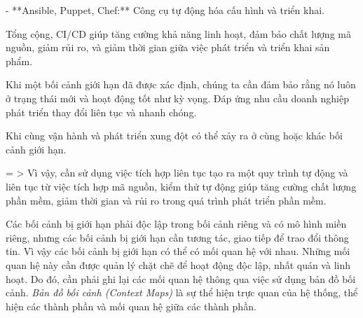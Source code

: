 - **Ansible, Puppet, Chef:** Công cụ tự động hóa cấu hình và triển khai.

Tổng cộng, CI/CD giúp tăng cường khả năng linh hoạt, đảm bảo chất lượng mã nguồn, giảm rủi ro, và giảm thời gian giữa việc phát triển và triển khai sản phẩm.











Khi một bối cảnh giới hạn đã được xác định, chúng ta cần đảm bảo rằng nó luôn ở trạng thái mới và hoạt động tốt như kỳ vọng. Đáp ứng nhu cầu doanh nghiệp phát triển thay đổi liên tục và nhanh chóng.

Khi cùng vận hành và phát triển xung đột có thể xảy ra ở cùng hoặc khác bối cảnh giới hạn.

= > Vì vậy, cần sử dụng việc tích hợp liên tục tạo ra một quy trình tự động và liên tục từ việc tích hợp mã nguồn, kiểm thử tự động giúp tăng cường chất lượng phần mềm, giảm thời gian và rủi ro trong quá trình phát triển phần mềm.








Các bối cảnh bị giới hạn phải độc lập trong bối cảnh riêng và có mô hình miền riêng, nhưng các bối cảnh bị giới hạn cần tương tác, giao tiếp để trao đổi thông tin. Vì vậy các bối cảnh bị giới hạn có thể có mối quan hệ với nhau. Những mối quan hệ này cần được quản lý chặt chẽ để hoạt động độc lập, nhất quán và linh hoạt. Do đó, cần phải ghi lại các mối quan hệ thông qua việc sử dụng bản đồ bối cảnh. \emph{Bản đồ bối cảnh (Context Maps)} là sự thể hiện trực quan của hệ thống, thể hiện các thành phần và mối quan hệ giữa các thành phần.

